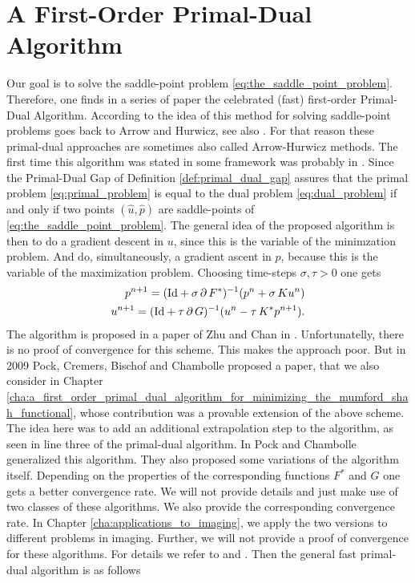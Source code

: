 \section{A First-Order Primal-Dual Algorithm} %
\label{sec:a_firs_order_primal_dual_algorithm}

    Our goal is to solve the saddle-point problem \ref{eq:the_saddle_point_problem}. Therefore, one finds in a series of paper the celebrated (fast) first-order Primal-Dual Algorithm. According to \cite{Chambolle-et-al-10} the idea of this method for solving saddle-point problems goes back to Arrow and Hurwicz, see also \cite{Arrow-Hurwicz}. For that reason these primal-dual approaches are sometimes also called Arrow-Hurwicz methods. The first time this algorithm was stated in some framework was probably in \cite{Appleton-Talbot}. Since the Primal-Dual Gap of Definition \ref{def:primal_dual_gap} assures that the primal problem \ref{eq:primal_problem} is equal to the dual problem \ref{eq:dual_problem} if and only if two points $(\hat{u}, \hat{p})$ are saddle-points of \ref{eq:the_saddle_point_problem}. The general idea of the proposed algorithm is then to do a gradient descent in $u$, since this is the variable of the minimzation problem. And do, simultaneously, a gradient ascent in $p$, because this is the variable of the maximization problem. Choosing time-steps $\sigma, \tau > 0$ one gets
        \begin{eqnarray}
            p^{n+1} = (\textnormal{Id} + \sigma\,\partial\,F^{\ast})^{-1}(p^{n} + \sigma\,Ku^{n}) \notag \\
            u^{n+1} = (\textnormal{Id} + \tau\,\partial\,G)^{-1}(u^{n} - \tau\,K^{\ast}p^{n+1}). \notag
        \end{eqnarray}
    The algorithm is proposed in a paper of Zhu and Chan in \cite{Zhu-Chan}. Unfortunatelly, there is no proof of convergence for this scheme. This makes the approach poor. But in 2009 Pock, Cremers, Bischof and Chambolle proposed a paper, that we also consider in Chapter \ref{cha:a_first_order_primal_dual_algorithm_for_minimizing_the_mumford_shah_functional}, whose contribution was a provable extension of the above scheme. The idea here was to add an additional extrapolation step to the algorithm, as seen in line three of the primal-dual algorithm. In \cite{Chambolle10afirst-order} Pock and Chambolle generalized this algorithm. They also proposed some variations of the algorithm itself. Depending on the properties of the corresponding functions $F^{\ast}$ and $G$ one gets a better convergence rate. We will not provide details and just make use of two classes of these algorithms. We also provide the corresponding convergence rate. In Chapter \ref{cha:applications_to_imaging}, we apply the two versions to different problems in imaging. Further, we will not provide a proof of convergence for these algorithms. For details we refer to \cite{Chambolle10afirst-order} and \cite{Pock-et-al-iccv09}. Then the general fast primal-dual algorithm is as follows

